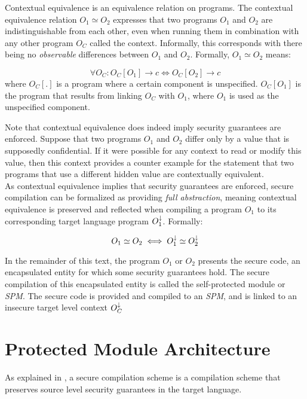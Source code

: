 Contextual equivalence is an equivalence relation on programs.
The contextual equivalence relation $O_{1} \simeq O_{2}$ expresses that two programs $O_1$ and $O_2$ are indistinguishable from each other, even when running them in combination with any other program $O_C$ called the context.
Informally, this corresponds with there being no \emph{observable} differences between $O_1$ and $O_2$.
Formally, $O_{1} \simeq O_{2}$ means:

\[
    \forall O_C : O_C[O_{1}] \rightarrow c \iff O_C[O_{2}] \rightarrow c
\]
where $O_{C}[.]$ is a program where a certain component is unspecified. 
$O_{C}[O_1]$ is the program that results from linking $O_C$ with $O_1$, where $O_1$ is used as the unspecified component.

Note that contextual equivalence does indeed imply security guarantees are enforced.
Suppose that two programs $O_1$ and $O_2$ differ only by a value that is supposedly confidential.
If it were possible for any context to read or modify this value, then this context provides a counter example for the statement that two programs that use a different hidden value are contextually equivalent.
\\[1em]
As contextual equivalence implies that security guarantees are enforced, secure compilation can be formalized as providing \emph{full abstraction}, meaning contextual equivalence is preserved and reflected when compiling a program $O_1$ to its corresponding target language program $O_1^{\downarrow}$. 
Formally:

\[
    O_{1} \simeq O_{2} \iff O_{1}^{\downarrow} \simeq O_{2}^{\downarrow}
\]

In the remainder of this text, the program $O_1$ or $O_2$ presents the secure code, an encapsulated entity for which some security guarantees hold.
The secure compilation of this encapsulated entity is called the self-protected module or \emph{SPM}.
The secure code is provided and compiled to an \emph{SPM}, and is linked to an insecure target level context $O_C^{\downarrow}$

\section{Protected Module Architecture}
\label{sec:protectedmodulearchitecture}
As explained in , a secure compilation scheme is a compilation scheme that preserves source level security guarantees in the target language.

